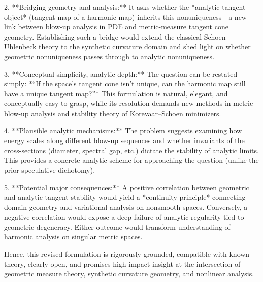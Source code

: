 2. **Bridging geometry and analysis:**  
   It asks whether the *analytic tangent object* (tangent map of a harmonic map) inherits this nonuniqueness—a new link between blow-up analysis in PDE and metric-measure tangent cone geometry. Establishing such a bridge would extend the classical Schoen–Uhlenbeck theory to the synthetic curvature domain and shed light on whether geometric nonuniqueness passes through to analytic nonuniqueness.

3. **Conceptual simplicity, analytic depth:**  
   The question can be restated simply: *“If the space’s tangent cone isn’t unique, can the harmonic map still have a unique tangent map?”*  
   This formulation is natural, elegant, and conceptually easy to grasp, while its resolution demands new methods in metric blow-up analysis and stability theory of Korevaar–Schoen minimizers.

4. **Plausible analytic mechanisms:**  
   The problem suggests examining how energy scales along different blow-up sequences and whether invariants of the cross-sections (diameter, spectral gap, etc.) dictate the stability of analytic limits. This provides a concrete analytic scheme for approaching the question (unlike the prior speculative dichotomy).

5. **Potential major consequences:**  
   A positive correlation between geometric and analytic tangent stability would yield a *continuity principle* connecting domain geometry and variational analysis on nonsmooth spaces. Conversely, a negative correlation would expose a deep failure of analytic regularity tied to geometric degeneracy. Either outcome would transform understanding of harmonic analysis on singular metric spaces.

Hence, this revised formulation is rigorously grounded, compatible with known theory, clearly open, and promises high-impact insight at the intersection of geometric measure theory, synthetic curvature geometry, and nonlinear analysis.